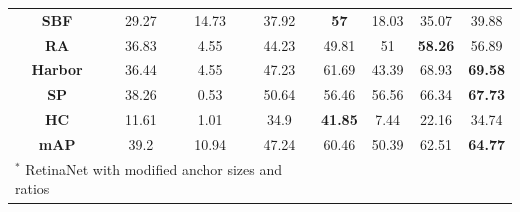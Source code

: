 \documentclass[conference]{IEEEtran}
\begin{document}
\begin{table}[t]
\begin{tabular}{cccccccc}
\textbf{SBF}    & 29.27         & 14.73        & 37.92         & \textbf{57}    & 18.03              & 35.07               & 39.88                  \\
\textbf{RA}     & 36.83         & 4.55         & 44.23         & 49.81          & 51                 & \textbf{58.26}      & 56.89                  \\
\textbf{Harbor} & 36.44         & 4.55         & 47.23         & 61.69          & 43.39              & 68.93               & \textbf{69.58}         \\
\textbf{SP}     & 38.26         & 0.53         & 50.64         & 56.46          & 56.56              & 66.34               & \textbf{67.73}         \\
\textbf{HC}     & 11.61         & 1.01         & 34.9          & \textbf{41.85} & 7.44               & 22.16               & 34.74                  \\ \hline
\textbf{mAP}    & 39.2          & 10.94        & 47.24         & 60.46          & 50.39              & 62.51               & \textbf{64.77}        \\ \hline
        \multicolumn{4}{l}{$^*$ RetinaNet with modified anchor sizes and ratios}
      \end{tabular}
      \label{tab:final}
    \end{table}    
\end{document}
